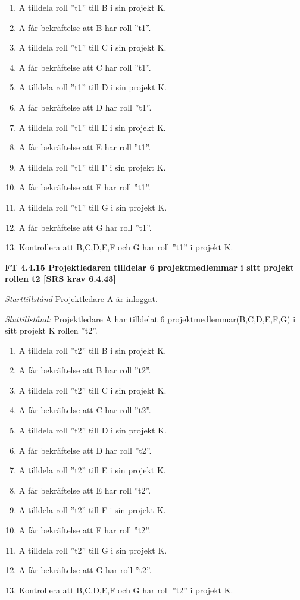 \documentclass[a4paper]{article}
\begin{document}
\begin{enumerate}
\item A tilldela roll ”t1” till B i sin projekt K. 
\item A får bekräftelse att B har roll ”t1”.
\item A tilldela roll ”t1” till C i sin projekt K. 
\item A får bekräftelse att C har roll ”t1”.
\item A tilldela roll ”t1” till D i sin projekt K.
\item A får bekräftelse att D har roll ”t1”.
\item A tilldela roll ”t1” till E i sin projekt K. 
\item A får bekräftelse att E har roll ”t1”.
\item A tilldela roll ”t1” till F i sin projekt K. 
\item A får bekräftelse att F har roll ”t1”.
\item A tilldela roll ”t1” till G i sin projekt K. 
\item A får bekräftelse att G har roll ”t1”.
\item Kontrollera att B,C,D,E,F och G har roll ”t1” i projekt K.
\end{enumerate}
\textbf{FT 4.4.15 Projektledaren tilldelar 6 projektmedlemmar i sitt projekt rollen t2 [SRS krav 6.4.43]}

\emph{Starttillstånd} Projektledare A är inloggat.

\emph{Sluttillstånd:} Projektledare A  har tilldelat 6 projektmedlemmar(B,C,D,E,F,G) i sitt projekt K rollen ''t2''.

\begin{enumerate}
\item A tilldela roll ”t2” till B i sin projekt K. 
\item A får bekräftelse att B har roll ”t2”.
\item A tilldela roll ”t2” till C i sin projekt K. 
\item A får bekräftelse att C har roll ”t2”.
\item A tilldela roll ”t2” till D i sin projekt K. 
\item A får bekräftelse att D har roll ”t2”.
\item A tilldela roll ”t2” till E i sin projekt K. 
\item A får bekräftelse att  E har roll ”t2”.
\item A tilldela roll ”t2” till  F i sin projekt K. 
\item A får bekräftelse att  F har roll ”t2”.
\item A tilldela roll ”t2” till G i sin projekt K. 
\item A får bekräftelse att G har roll ”t2”.
\item Kontrollera att B,C,D,E,F och G har roll ”t2” i projekt K.
\end{enumerate}
\end{document}
